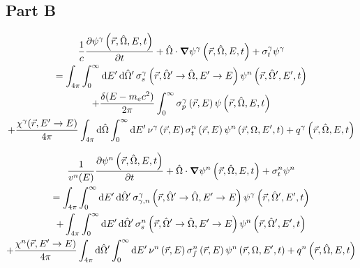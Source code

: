 \documentclass{article}
\begin{document}
\subsection{Part B}
\begin{multline*}
  \frac{1}{c} \pdv{\psig\phase}{t}
  + \hat{\Omega}\cdot\grad\psig\phase
  + \sigma^{\gamma}_t\psig
  \\
  =
  \int_{4\pi}\int_0^{\infty}\dd{E'}\dd{\hat{\Omega}'}\sigma_s^{\gamma}\double \psin\psid
  \\+ \frac{\delta(E - m_ec^2)}{2\pi}\int_0^{\infty}\sigma_p^{\gamma}\renergy\psi\phase
  \\+ \frac{\chi^{\gamma}(\vec{r}, E'\rightarrow E)}{4\pi}\int_{4\pi}\dd{\hat{\Omega}}\int_0^{\infty}\dd{E'}\nu^{\gamma}\renergy\sigma_t^n\renergy\psin\left(\vec{r}, \Omega, E', t\right)
  + q^{\gamma}\phase
\end{multline*}

\begin{multline*}
  \frac{1}{v^n(E)} \pdv{\psin\phase}{t}
  + \hat{\Omega}\cdot\grad\psin\phase
  + \sigma^{n}_t\psin
  \\
  =
  \int_{4\pi}\int_0^{\infty}\dd{E'}\dd{\hat{\Omega}'}\sigma_{\gamma,n}^{\gamma}\double \psig\psid
  \\ + \int_{4\pi}\int_0^{\infty}\dd{E'}\dd{\hat{\Omega}'}\sigma_s^{n}\double \psin\psid
  \\+ \frac{\chi^{n}(\vec{r}, E'\rightarrow E)}{4\pi}\int_{4\pi}\dd{\hat{\Omega}'}\int_0^{\infty}\dd{E'}\nu^{n}\renergy\sigma_f^n\renergy\psin\left(\vec{r}, \Omega, E', t\right)
  + q^n\phase
\end{multline*}
\end{document}
